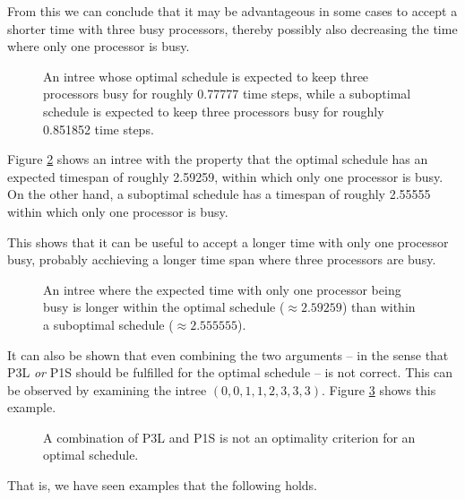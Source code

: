 From this we can conclude that it may be advantageous in some cases to accept a shorter time with three busy processors, thereby possibly also decreasing the time where only one processor is busy.

\begin{figure}[ht]
  \centering
  
  \caption{An intree whose optimal schedule is expected to keep three processors busy for roughly 0.77777 time steps, while a suboptimal schedule is expected to keep three processors busy for roughly 0.851852 time steps.}
  \label{fig:p3-p3l-suboptimal-example}
\end{figure}

Figure \ref{fig:p3-p1s-suboptimal-example} shows an intree with the property that the optimal schedule has an expected timespan of roughly 2.59259, within which only one processor is busy. On the other hand, a suboptimal schedule has a timespan of roughly 2.55555 within which only one processor is busy.

This shows that it can be useful to accept a longer time with only one processor busy, probably acchieving a longer time span where three processors are busy.

\begin{figure}[ht]
  \centering
  
  \caption{An intree where the expected time with only one processor being busy is longer within the optimal schedule ($\approx 2.59259$) than within a suboptimal schedule ($\approx 2.555555$). }
  \label{fig:p3-p1s-suboptimal-example}
\end{figure}

It can also be shown that even combining the two arguments -- in the sense that P3L \emph{or} P1S should be fulfilled for the optimal schedule -- is not correct. This can be observed by examining the intree $(0, 0, 1, 1, 2, 3, 3, 3)$. Figure \ref{fig:p3l-p1s-combo-suboptimal} shows this example.

\begin{figure}[ht]
  \centering
  
  \caption{A combination of P3L and P1S is not an optimality criterion for an optimal schedule.}
  \label{fig:p3l-p1s-combo-suboptimal}
\end{figure}

That is, we have seen examples that the following holds.

